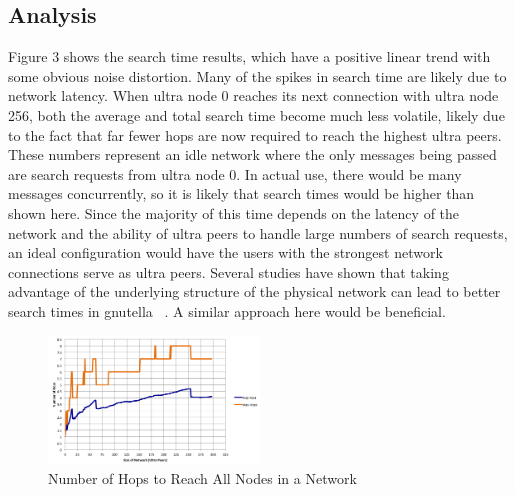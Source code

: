 \documentclass{acm_proc_article-sp}
\begin{document}
\subsection{Analysis}

Figure 3 shows the search time results, which have a positive linear trend with some obvious noise distortion.  Many of the spikes in search time are likely due to network latency.  When ultra node 0 reaches its next connection with ultra node 256, both the average and total search time become much less volatile, likely due to the fact that far fewer hops are now required to reach the highest ultra peers. These numbers represent an idle network where the only messages being passed are search requests from ultra node 0.
In actual use, there would be many messages concurrently, so it is likely that search times would be higher than shown here. Since the majority of this time depends on the latency of the network and the ability of ultra peers to handle large numbers of search requests, an ideal configuration would have the users with the strongest network connections serve as ultra peers.  Several studies have shown that taking advantage of the underlying structure of the physical network can lead to better search times in gnutella ~\cite{Ripeanu}.  A similar approach here would be beneficial.       


\begin{figure}[tbh]
\centering
\includegraphics[width=0.5\textwidth]{hops}
\caption{Number of Hops to Reach All Nodes in a Network}
\end{figure}
\end{document}
